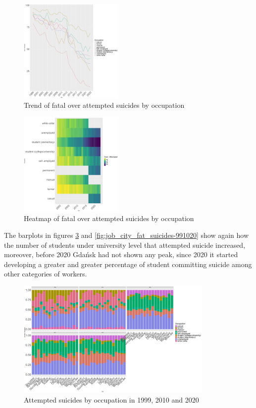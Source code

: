 \documentclass{article}
\begin{document}
\begin{figure}[H]
    \centering
    \includegraphics[width=0.45\textwidth]{imgs/job_foa.pdf}
    \caption{Trend of fatal over attempted suicides by occupation}
    \label{fig:job_foa}
\end{figure}

\begin{figure}[H]
    \centering
    \includegraphics[width=0.45\textwidth]{imgs/job_foa_heat.pdf}
    \caption{Heatmap of fatal over attempted suicides by occupation}
    \label{fig:job_foa_heat}
\end{figure}
%
%
The barplots in figures \ref{fig:job_city_att_suicides-991020} and 
\ref{fig:job_city_fat_suicides-991020}
show again how the number of students under university level that attempted
suicide increased, moreover, before 2020 Gdańsk had not shown any peak,
since 2020 it started developing a greater and greater percentage of student
committing suicide among other categories of workers.
\begin{figure}[H]
    \centering
    \includegraphics[width=0.85\textwidth]{imgs/job_city_att_suicides-991020.pdf}
    \caption{Attempted suicides by occupation in 1999, 2010 and 2020}
    \label{fig:job_city_att_suicides-991020}
\end{figure}
\end{document}

